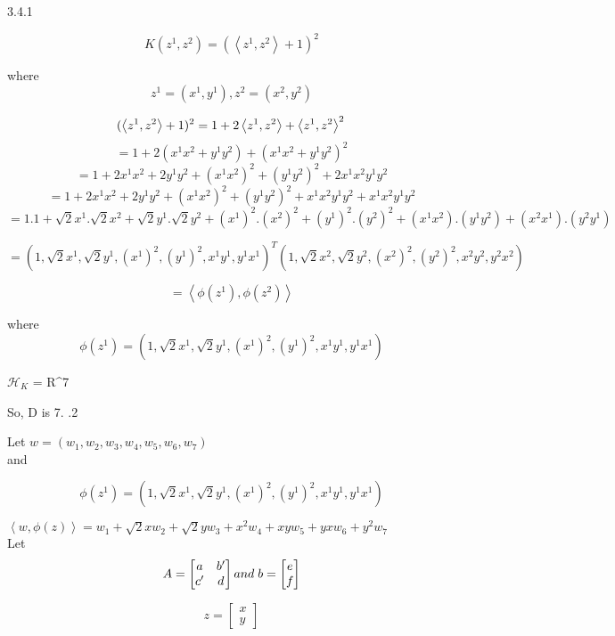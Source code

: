\documentclass[a4paper,11pt]{article}
\begin{document}
\begin{mlsolution}

3.4.1

\[
K(z^{1}, z^{2}) = (\left \langle z^{1}, z^{2} \right \rangle + 1)^{2}
\]

where \[z^{1} = (x^{1}, y^{1}), z^{2}=(x^{2}, y^{2})\]

\[

(\left \langle z^{1}, z^{2} \right \rangle + 1)^{2} = 1 + 2 \left \langle  z^{1}, z^{2} \right \rangle + \left \langle  z^{1}, z^{2} \right \rangle^{2}\\
\]
\[
= 1  + 2(x^1x^2 + y^1y^2) + (x^1x^2 + y^1y^2)^2
\]
\[
= 1 + 2x^1x^2 + 2y^1y^2 + (x^1x^2)^2 + (y^1y^2)^2 + 2x^1x^2y^1y^2
\]
\[
= 1 + 2x^1x^2 + 2y^1y^2 + (x^1x^2)^2 + (y^1y^2)^2 + x^1x^2y^1y^2 + x^1x^2y^1y^2
\]
\[
= 1.1 + \sqrt{2}x^1.\sqrt{2}x^2 + \sqrt{2}y^1.\sqrt{2}y^2 + (x^1)^2.(x^2)^2 + (y^1)^2.(y^2)^2 + (x^1x^2).(y^1y^2) + (x^2x^1).(y^2y^1)
\]

\[
= (1, \sqrt{2}x^1, \sqrt{2}y^1,(x^1)^2, (y^1)^2, x^1y^1, y^1x^1)^T(1, \sqrt{2}x^2, \sqrt{2}y^2,(x^2)^2, (y^2)^2, x^2y^2, y^2x^2)
\]

\[
= \left \langle \phi(z^1), \phi(z^2) \right \rangle
\]

where 
\[

\phi(z^1) = (1, \sqrt{2}x^1, \sqrt{2}y^1,(x^1)^2, (y^1)^2, x^1y^1, y^1x^1)

\]

$\mathcal{H}_{K}$ = R^{7}

So, D is 7.
.2

Let $w = \left (  w_1, w_2, w_3, w_4, w_5, w_6, w_7\right )$\\

and

\[
\phi(z^1) = (1, \sqrt{2}x^1, \sqrt{2}y^1,(x^1)^2, (y^1)^2, x^1y^1, y^1x^1)
\]

$\left \langle w, \phi(z) \right \rangle = w_1 + \sqrt{2}xw_2 + \sqrt{2}yw_3 + x^2w_4 + xyw_5 + yxw_6 + y^2w_7$
\\

Let
\[
A =\begin{bmatrix}
a & b'\\ 
c' & d
\end{bmatrix}
\\
and\;
b = \begin{bmatrix}
e\\
f
\end{bmatrix}
\]

\[
z = \begin{bmatrix}
x\\
y
\end{bmatrix}
\]


\end{mlsolution}
\end{document}
